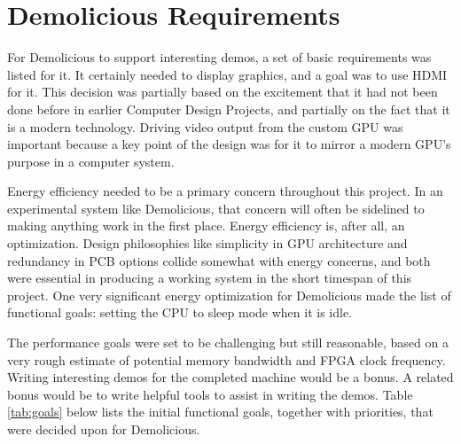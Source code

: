 \documentclass[../main/report.tex]{subfiles}
\begin{document}
\section{Demolicious Requirements}

For Demolicious to support interesting demos, a set of basic requirements was listed for it.
It certainly needed to display graphics, and a goal was to use HDMI for it.
This decision was partially based on the excitement that it had not been done before in earlier Computer Design Projects, and partially on the fact that it is a modern technology.
Driving video output from the custom GPU was important because a key point of the design was for it to mirror a modern GPU's purpose in a computer system.

Energy efficiency needed to be a primary concern throughout this project.
In an experimental system like Demolicious, that concern will often be sidelined to making anything work in the first place.
Energy efficiency is, after all, an optimization.
Design philosophies like simplicity in GPU architecture and redundancy in PCB options collide somewhat with energy concerns, and both were essential in producing a working system in the short timespan of this project.
One very significant energy optimization for Demolicious made the list of functional goals: setting the CPU to sleep mode when it is idle.

The performance goals were set to be challenging but still reasonable, based on a very rough estimate of potential memory bandwidth and FPGA clock frequency.
Writing interesting demos for the completed machine would be a bonus.
A related bonus would be to write helpful tools to assist in writing the demos.
Table \ref{tab:goals} below lists the initial functional goals, together with priorities, that were decided upon for Demolicious.
\end{document}
